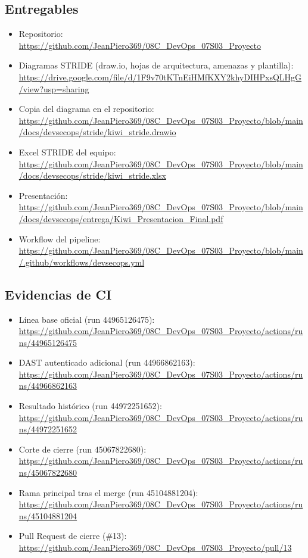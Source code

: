 \documentclass[12pt,a4paper]{article}
\begin{document}
\subsection{Entregables}

\begin{itemize}[leftmargin=*]
  \item Repositorio:
  \url{https://github.com/JeanPiero369/08C_DevOps_07S03_Proyecto}
  \item Diagramas STRIDE (draw.io, hojas de arquitectura, amenazas y plantilla):
  \url{https://drive.google.com/file/d/1F9v70tKTnEiHMfKXY2khyDIHPxsQLHgG/view?usp=sharing}
  \item Copia del diagrama en el repositorio:
  \url{https://github.com/JeanPiero369/08C_DevOps_07S03_Proyecto/blob/main/docs/devsecops/stride/kiwi_stride.drawio}
  \item Excel STRIDE del equipo:
  \url{https://github.com/JeanPiero369/08C_DevOps_07S03_Proyecto/blob/main/docs/devsecops/stride/kiwi_stride.xlsx}
  \item Presentación:
  \url{https://github.com/JeanPiero369/08C_DevOps_07S03_Proyecto/blob/main/docs/devsecops/entrega/Kiwi_Presentacion_Final.pdf}
  \item Workflow del pipeline:
  \url{https://github.com/JeanPiero369/08C_DevOps_07S03_Proyecto/blob/main/.github/workflows/devsecops.yml}
\end{itemize}

\subsection{Evidencias de CI}

\begin{itemize}[leftmargin=*]
  \item Línea base oficial (run 44965126475):
  \url{https://github.com/JeanPiero369/08C_DevOps_07S03_Proyecto/actions/runs/44965126475}
  \item DAST autenticado adicional (run 44966862163):
  \url{https://github.com/JeanPiero369/08C_DevOps_07S03_Proyecto/actions/runs/44966862163}
  \item Resultado histórico (run 44972251652):
  \url{https://github.com/JeanPiero369/08C_DevOps_07S03_Proyecto/actions/runs/44972251652}
  \item Corte de cierre (run 45067822680):
  \url{https://github.com/JeanPiero369/08C_DevOps_07S03_Proyecto/actions/runs/45067822680}
  \item Rama principal tras el merge (run 45104881204):
  \url{https://github.com/JeanPiero369/08C_DevOps_07S03_Proyecto/actions/runs/45104881204}
  \item Pull Request de cierre (\#13):
  \url{https://github.com/JeanPiero369/08C_DevOps_07S03_Proyecto/pull/13}
\end{itemize}
\end{document}
